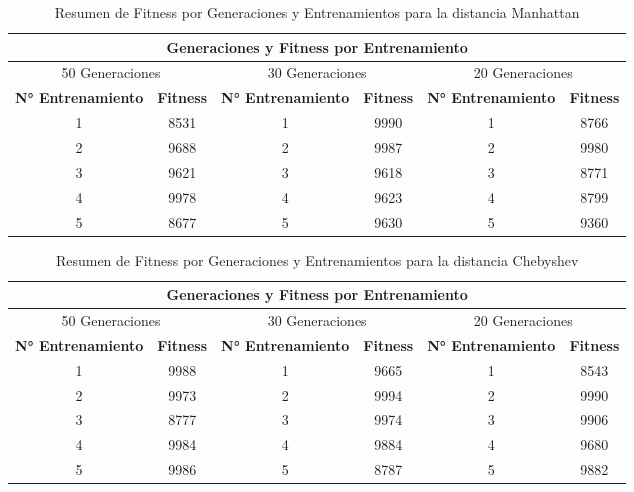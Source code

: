 \documentclass[conference]{IEEEtran}
\begin{document}
\begin{table}[ht]
    \centering
    \caption{Resumen de Fitness por Generaciones y Entrenamientos para la distancia Manhattan}
    \label{tab:fitness_generaciones_manhattan}
    \begin{tabular}{cccccc}
        \toprule
        \multicolumn{6}{c}{Generaciones y Fitness por Entrenamiento} \\
        \midrule
        \multicolumn{2}{c}{50 Generaciones} & \multicolumn{2}{c}{30 Generaciones} & \multicolumn{2}{c}{20 Generaciones} \\
        \cmidrule(lr){1-2} \cmidrule(lr){3-4} \cmidrule(lr){5-6}
        \textbf{N° Entrenamiento} & \textbf{Fitness} & \textbf{N° Entrenamiento} & \textbf{Fitness} & \textbf{N° Entrenamiento} & \textbf{Fitness} \\
        \midrule
        1 & 8531 & 1 & 9990 & 1 & 8766 \\
        2 & 9688 & 2 & 9987 & 2 & 9980 \\
        3 & 9621 & 3 & 9618 & 3 & 8771 \\
        4 & 9978 & 4 & 9623 & 4 & 8799 \\
        5 & 8677 & 5 & 9630 & 5 & 9360 \\
        \bottomrule
    \end{tabular}
\end{table}

\begin{table}[ht]
    \centering
    \caption{Resumen de Fitness por Generaciones y Entrenamientos para la distancia Chebyshev}
    \label{tab:fitness_generaciones_chebyshev}
    \begin{tabular}{cccccc}
        \toprule
        \multicolumn{6}{c}{Generaciones y Fitness por Entrenamiento} \\
        \midrule
        \multicolumn{2}{c}{50 Generaciones} & \multicolumn{2}{c}{30 Generaciones} & \multicolumn{2}{c}{20 Generaciones} \\
        \cmidrule(lr){1-2} \cmidrule(lr){3-4} \cmidrule(lr){5-6}
        \textbf{N° Entrenamiento} & \textbf{Fitness} & \textbf{N° Entrenamiento} & \textbf{Fitness} & \textbf{N° Entrenamiento} & \textbf{Fitness} \\
        \midrule
        1 & 9988 & 1 & 9665 & 1 & 8543 \\
        2 & 9973 & 2 & 9994 & 2 & 9990 \\
        3 & 8777 & 3 & 9974 & 3 & 9906 \\
        4 & 9984 & 4 & 9884 & 4 & 9680 \\
        5 & 9986 & 5 & 8787 & 5 & 9882 \\
        \bottomrule
    \end{tabular}
\end{table}
\end{document}
